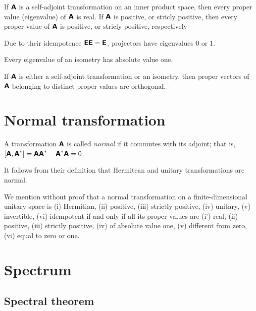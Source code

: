 If $\textsf{\textbf{A}}$
is a self-adjoint transformation on an inner product space, then every proper value (eigenvalue)  of $\textsf{\textbf{A}}$
is real.
If $\textsf{\textbf{A}}$ is positive, or stricly positive,
then every proper value of  $\textsf{\textbf{A}}$ is positive, or stricly positive, respectively

Due to their idempotence $\textsf{\textbf{E}}\textsf{\textbf{E}}=\textsf{\textbf{E}}$,
projectors have eigenvalues $0$ or $1$.

Every eigenvalue of an isometry has absolute value one.

If  $\textsf{\textbf{A}}$  is either a self-adjoint transformation or an isometry,
then proper vectors of $ \textsf{\textbf{A}}$
belonging to distinct proper values are orthogonal.


\section{Normal transformation}

A transformation $\textsf{\textbf{A}}$ is called {\em normal}
if it commutes with its adjoint; that is, $[\textsf{\textbf{A}},\textsf{\textbf{A}}^*]= \textsf{\textbf{A}}\textsf{\textbf{A}}^* -
\textsf{\textbf{A}}^* \textsf{\textbf{A}} =0$.

It follows from their definition that Hermitean and unitary transformations are normal.


We mention without proof that
a normal transformation on a finite-dimensional unitary space is
(i) Hermitian,
(ii) positive,
(iii) strictly positive,
(iv) unitary,
(v) invertible,
(vi) idempotent
if and only if all its proper values are
(i') real,
(ii) positive,
(iii) strictly positive,
(iv) of absolute value one,
(v) different from zero,
(vi) equal to zero or one.

\section{Spectrum}

\subsection{Spectral theorem}

